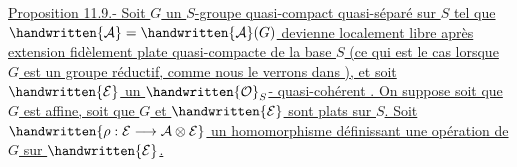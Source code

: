 \uline{Proposition 11.9.- Soit $G$ un $S$-groupe quasi-compact quasi-séparé sur $S$ tel que $\handwritten{\mathcal{A}}=\handwritten{\mathcal{A}}(G)$ devienne localement libre après extension fidèlement plate quasi-compacte de la base $S$ (ce qui est le cas lorsque $G$ est un groupe réductif, comme nous le verrons dans  ), et soit $\handwritten{\mathcal{E}}$ un $\handwritten{\mathcal{O}}_S$- quasi-cohérent . On suppose soit que $G$ est affine, soit que $G$ et $\handwritten{\mathcal{E}}$ sont plats sur $S$. Soit $\handwritten{\rho:\mathcal{E}\longrightarrow\mathcal{A}\otimes\mathcal{E}}$ un homomorphisme définissant une opération de $G$ sur $\handwritten{\mathcal{E}}$.}

